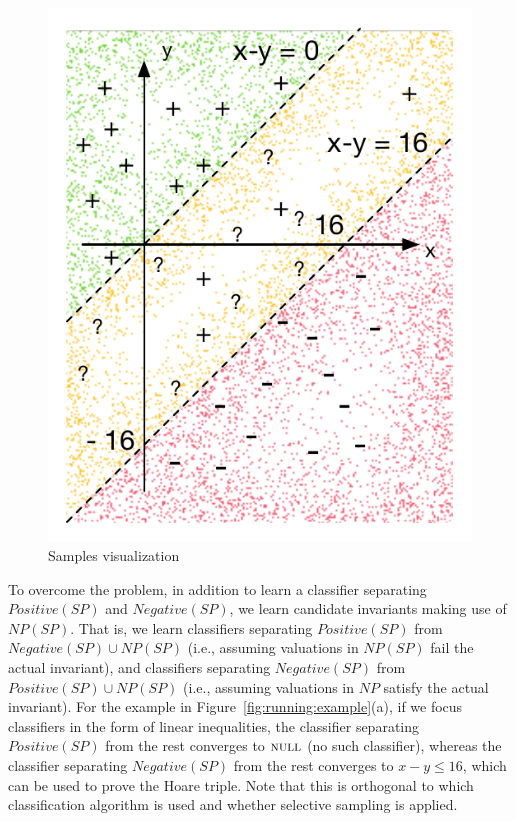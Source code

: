  \begin{figure}
	 \vspace{-8mm}
\centering
\includegraphics[scale=0.42]{figures/running-sampling.pdf}
 \caption{Samples visualization}
  \vspace{-6mm}
      \label{fig:running:example:sampling}
 \end{figure}

To overcome the problem, in addition to learn a classifier separating $Positive(SP)$ and $Negative(SP)$, we learn candidate invariants making use of $NP(SP)$. That is, we learn classifiers separating $Positive(SP)$ from $Negative(SP) \cup NP(SP)$ (i.e., assuming valuations in $NP(SP)$ fail the actual invariant), and classifiers separating $Negative(SP)$ from $Positive(SP) \cup NP(SP)$ (i.e., assuming valuations in $NP$ satisfy the actual invariant). For the example in Figure~\ref{fig:running:example}(a), if we focus classifiers in the form of linear inequalities, the classifier separating $Positive(SP)$ from the rest converges to $\textsc{null}$ (no such classifier), whereas the classifier separating $Negative(SP)$ from the rest converges to $x - y \leq 16$, which can be used to prove the Hoare triple. Note that this is orthogonal to which classification algorithm is used and whether selective sampling is applied.

%
